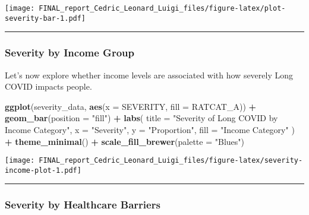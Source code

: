 \documentclass[
]{article}
\newenvironment{Shaded}{\begin{snugshade}}{\end{snugshade}}
\newcommand{\AttributeTok}[1]{\textcolor[rgb]{0.13,0.29,0.53}{#1}}
\newcommand{\FunctionTok}[1]{\textcolor[rgb]{0.13,0.29,0.53}{\textbf{#1}}}
\newcommand{\NormalTok}[1]{#1}
\newcommand{\SpecialCharTok}[1]{\textcolor[rgb]{0.81,0.36,0.00}{\textbf{#1}}}
\newcommand{\StringTok}[1]{\textcolor[rgb]{0.31,0.60,0.02}{#1}}
\begin{document}
\texttt{[image: FINAL\_report\_Cedric\_Leonard\_Luigi\_files/figure-latex/plot-severity-bar-1.pdf]}

\begin{center}\rule{0.5\linewidth}{0.5pt}\end{center}

\subsubsection{Severity by Income Group}\label{severity-by-income-group}

Let's now explore whether income levels are associated with how severely
Long COVID impacts people.

\begin{Shaded}
\begin{Highlighting}[]
\FunctionTok{ggplot}\NormalTok{(severity\_data, }\FunctionTok{aes}\NormalTok{(}\AttributeTok{x =}\NormalTok{ SEVERITY, }\AttributeTok{fill =}\NormalTok{ RATCAT\_A)) }\SpecialCharTok{+}
  \FunctionTok{geom\_bar}\NormalTok{(}\AttributeTok{position =} \StringTok{"fill"}\NormalTok{) }\SpecialCharTok{+}
  \FunctionTok{labs}\NormalTok{(}
    \AttributeTok{title =} \StringTok{"Severity of Long COVID by Income Category"}\NormalTok{,}
    \AttributeTok{x =} \StringTok{"Severity"}\NormalTok{,}
    \AttributeTok{y =} \StringTok{"Proportion"}\NormalTok{,}
    \AttributeTok{fill =} \StringTok{"Income Category"}
\NormalTok{  ) }\SpecialCharTok{+}
  \FunctionTok{theme\_minimal}\NormalTok{() }\SpecialCharTok{+}
  \FunctionTok{scale\_fill\_brewer}\NormalTok{(}\AttributeTok{palette =} \StringTok{"Blues"}\NormalTok{)}
\end{Highlighting}
\end{Shaded}

\texttt{[image: FINAL\_report\_Cedric\_Leonard\_Luigi\_files/figure-latex/severity-income-plot-1.pdf]}

\begin{center}\rule{0.5\linewidth}{0.5pt}\end{center}

\subsubsection{Severity by Healthcare
Barriers}\label{severity-by-healthcare-barriers}
\end{document}
